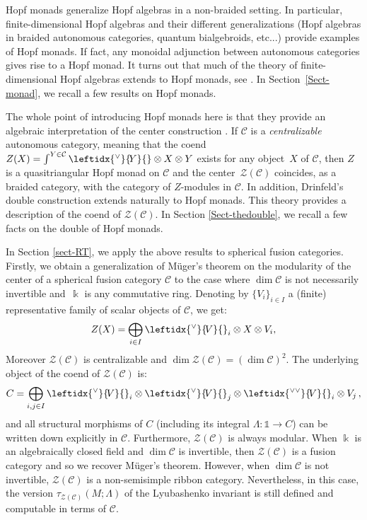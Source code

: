 \documentclass[a4paper]{amsart}
\theoremstyle{definition}
\newcommand{\co}{\colon}
\newcommand{\cc}{\mathcal{C}}
\newcommand{\zz}{\mathcal{Z}}
\newcommand{\kk}{\Bbbk}
\newcommand{\un}{\mathbb{1}}
\newcommand{\ldual}[1]{\leftidx{^\vee}{\!#1}{}}
\newcommand{\lldual}[1]{\leftidx{^{\vee\vee}}{\!#1}{}}
\begin{document}
Hopf monads generalize Hopf algebras in a non-braided setting. In particular, finite-dimensional Hopf algebras and their
different generalizations (Hopf algebras in braided autonomous categories, quantum bialgebroids, etc...) provide examples of
Hopf monads. If fact, any monoidal adjunction between autonomous categories gives rise to a Hopf monad. It turns out that
much of the theory of finite-dimensional Hopf algebras extends to Hopf monads, see \cite{BV2}. In Section~\ref{Sect-monad}, we recall a few results on Hopf monads.

The whole point of introducing Hopf monads here is that they provide an algebraic interpretation of the center construction
\cite{BV3}. If $\cc$ is a \emph{centralizable} autonomous category, meaning that the coend $Z(X)=\int^{Y \in \cc} \ldual{Y}
\otimes X \otimes Y$ exists for any object~$X$ of $\cc$, then $Z$ is a quasitriangular Hopf monad on $\cc$ and the center~$\zz(\cc)$ coincides, as a braided category, with the category of $Z$-modules in $\cc$. In addition, Drinfeld's double
construction extends naturally to Hopf monads. This theory provides a description of the coend of $\zz(\cc)$. In Section
\ref{Sect-thedouble}, we recall a few facts on the double of Hopf monads.

\medskip
In Section \ref{sect-RT}, we apply the above results to spherical fusion categories. Firstly, we obtain a generalization of
M\"uger's theorem on the modularity of the center of a spherical fusion category $\cc$ to the case where $\dim\cc$ is not
necessarily invertible and~$\kk$ is any commutative ring. Denoting by $\{V_i\}_{i \in I}$ a (finite) representative family of scalar
objects of $\cc$, we get:
\begin{equation*}
Z(X)=\bigoplus_{i \in I} \ldual{V}_i \otimes X \otimes V_i,
\end{equation*}
Moreover $\zz(\cc)$ is centralizable and $\dim\zz(\cc)=(\dim\cc)^2$. The underlying object of the coend of
$\zz(\cc)$ is:
\begin{equation*}
C=\bigoplus_{i,j \in I} \ldual{V}_i \otimes \ldual{V}_j \otimes \lldual{V}_i \otimes V_j\,,
\end{equation*}
and all structural morphisms of $C$ (including its integral $\Lambda\co \un \to C$) can be written down explicitly in $\cc$.
Furthermore, $\zz(\cc)$ is always modular. When $\kk$ is an algebraically closed field and $\dim\cc$ is invertible, then $\zz(\cc)$
is a fusion category and so we recover M\"uger's theorem. However, when $\dim\cc$ is not invertible, $\zz(\cc)$ is a non-semisimple
ribbon category. Nevertheless, in this case, the version $\tau_{\zz(\cc)}(M;\Lambda)$ of the Lyubashenko invariant is still
defined and computable in terms of $\cc$.
\end{document}
